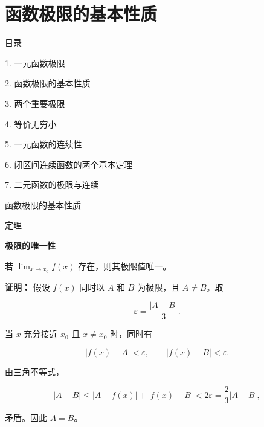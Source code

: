 \documentclass[aspectratio=169,10pt,fontset=fandol]{ctexbeamer}
\begin{document}
\section{函数极限的基本性质}
\begin{frame}[t,fragile]{目录}
\normalsize
{\color{black}\normalsize 1. 一元函数极限\par}\vspace{0.22em}
{\color{blue}\normalsize 2. 函数极限的基本性质\par}\vspace{0.22em}
{\color{gray!40}\normalsize 3. 两个重要极限\par}\vspace{0.22em}
{\color{gray!40}\normalsize 4. 等价无穷小\par}\vspace{0.22em}
{\color{gray!40}\normalsize 5. 一元函数的连续性\par}\vspace{0.22em}
{\color{gray!40}\normalsize 6. 闭区间连续函数的两个基本定理\par}\vspace{0.22em}
{\color{gray!40}\normalsize 7. 二元函数的极限与连续\par}\vspace{0.22em}
\end{frame}
\begin{frame}[t,fragile]{函数极限的基本性质}
\small
\begin{block}{定理}
{\small
\textbf{极限的唯一性}\par


若 \(\lim_{x\to x_0}f(x)\) 存在，则其极限值唯一。


}
\end{block}
\pause
{\small
\textbf{证明：}
假设 \(f(x)\) 同时以 \(A\) 和 \(B\) 为极限，且 \(A\neq B\)。取

\[

\varepsilon=\frac{|A-B|}{3}.

\]

当 \(x\) 充分接近 \(x_0\) 且 \(x\neq x_0\) 时，同时有

\[

|f(x)-A|<\varepsilon,\qquad |f(x)-B|<\varepsilon.

\]

由三角不等式，

\[

|A-B|\leq |A-f(x)|+|f(x)-B|<2\varepsilon=\frac23|A-B|,

\]

矛盾。因此 \(A=B\)。


}
\end{frame}
\end{document}
